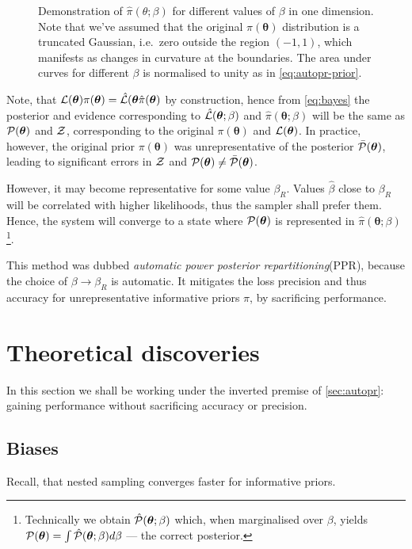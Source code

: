 \documentclass[usenatbib]{mnras}
\begin{document}
\begin{figure}
 
 \caption{\label{fig:ppr} Demonstration of
   \(\hat{\pi}(\theta; \beta)\) for different values of \(\beta\) in
   one dimension. Note that we've assumed that the original
   \( \pi (\bm{\theta})\) distribution is a truncated Gaussian,
   i.e.~zero outside the region \((-1, 1)\), which manifests as
   changes in curvature at the boundaries. The area under curves for
   different $\beta$ is normalised to unity as in
   \cref{eq:autopr-prior}. }
\end{figure}

Note, that
\({\cal L}(\bm{\theta})\pi (\bm{\theta}) = \hat{\cal L}(\bm{\theta}
\hat{\pi} (\bm{\theta})\) by construction, hence from \cref{eq:bayes}
the posterior and evidence corresponding to
\(\hat{\cal L}(\bm{\theta};\beta)\) and
\(\hat{\pi} (\bm{\theta};\beta)\) will be the same as
\( {\cal P} (\bm{\theta})\) and \({\cal Z}\), corresponding to the
original $\pi(\bm{\theta})$ and ${\cal L}(\bm{\theta})$.  In practice,
however, the original prior \(\pi (\bm{\theta})\) was unrepresentative
of the posterior \( \bar{\cal P} (\bm{\theta})\), leading to
significant errors in ${\cal Z}$ and
${\cal P}(\bm{\theta}) \ne \bar{\cal P}(\bm{\theta})$.

However, it may become representative for some value
$\beta_{R}$. Values $\hat{\beta}$ close to $\beta_{R}$ will be
correlated with higher likelihoods, thus the sampler shall prefer
them. Hence, the system will converge to a state where
\( {\cal P} (\bm{\theta})\) is represented in
\(\hat{\pi} (\bm{\theta};\beta)\)\footnote{Technically we obtain
  \( \hat{\cal P} (\bm{\theta};\beta)\) which, when marginalised over
  $\beta$, yields
  \( {\cal P} (\bm{\theta}) = \int \hat{\cal P} (\bm{\theta};\beta) d
  \beta\) --- the correct posterior.}.

This method was dubbed \emph{automatic power posterior
  repartitioning}(PPR), because the choice of
$\beta\rightarrow\beta_{R}$ is automatic. It mitigates the loss
precision and thus accuracy for unrepresentative informative priors
$\pi$, by sacrificing performance.


\section{Theoretical discoveries}
In this section we shall be working under the inverted premise of
\cref{sec:autopr}: gaining performance without sacrificing accuracy or
precision.

\subsection{Biases\label{discussion-bias}}
Recall, that nested sampling converges faster for informative priors.
\end{document}
